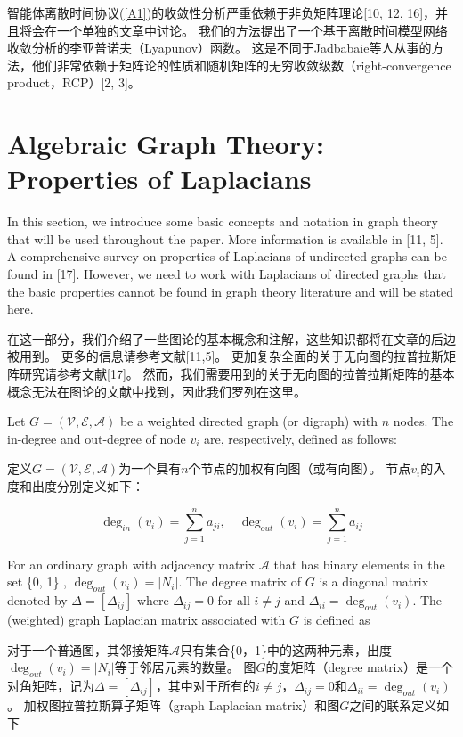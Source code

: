 \documentclass{article}
\begin{document}
智能体离散时间协议(\ref{A1})的收敛性分析严重依赖于非负矩阵理论[10, 12, 16]，并且将会在一个单独的文章中讨论。
我们的方法提出了一个基于离散时间模型网络收敛分析的李亚普诺夫（Lyapunov）函数。
这是不同于Jadbabaie等人从事的方法，他们非常依赖于矩阵论的性质和随机矩阵的无穷收敛级数（right-convergence product，RCP）[2, 3]。

\section{Algebraic Graph Theory: Properties of Laplacians}
{\color[gray]{0.5}
\noindent In this section, we introduce some basic concepts and notation in graph theory that will be used throughout the paper. 
More information is available in [11, 5]. 
A comprehensive survey on properties of Laplacians of undirected graphs can be found in [17]. 
However, we need to work with Laplacians of directed graphs that the basic properties cannot be found in graph theory literature and will be stated here.
}

\noindent 在这一部分，我们介绍了一些图论的基本概念和注解，这些知识都将在文章的后边被用到。
更多的信息请参考文献[11,5]。
更加复杂全面的关于无向图的拉普拉斯矩阵研究请参考文献[17]。
然而，我们需要用到的关于无向图的拉普拉斯矩阵的基本概念无法在图论的文献中找到，因此我们罗列在这里。

{\color[gray]{0.5}
Let $G=(\mathcal{V}, \mathcal{E}, \mathcal{A})$ be a weighted directed graph (or digraph) with $n$ nodes. 
The in-degree and out-degree of node $v_i$ are, respectively, deﬁned as follows:
}

定义$G=(\mathcal{V}, \mathcal{E}, \mathcal{A})$为一个具有$n$个节点的加权有向图（或有向图）。
节点$v_i$的入度和出度分别定义如下：

\begin{equation}
    \deg_{in}(v_i) = \sum_{j=1}^{n}a_{ji},\quad \deg_{out}(v_i) = \sum_{j=1}^{n}a_{ij}
    \tag{11}
    \label{11}
\end{equation}

{\color[gray]{0.5}
\noindent For an ordinary graph with adjacency matrix $\mathcal{A}$ that has binary elements in the set \{0, 1\} , $\deg_{out}(v_i) = |N_i|$. 
The degree matrix of $G$ is a diagonal matrix denoted by $\Delta=[\Delta_{ij}]$ where $\Delta_{ij}=0$ for all $i\ne j$ and $\Delta_{ii}=\deg_{out}(v_i)$. 
The (weighted) graph Laplacian matrix associated with $G$ is deﬁned as
}

\noindent 对于一个普通图，其邻接矩阵$\mathcal{A}$只有集合\{0，1\}中的这两种元素，出度$\deg_{out}(v_i) = |N_i|$等于邻居元素的数量。
图$G$的度矩阵（degree matrix）是一个对角矩阵，记为$\Delta=[\Delta_{ij}]$，其中对于所有的$i\ne j$，$\Delta_{ij}=0$和$\Delta_{ii}=\deg_{out}(v_i)$。
加权图拉普拉斯算子矩阵（graph Laplacian matrix）和图$G$之间的联系定义如下
\end{document}
